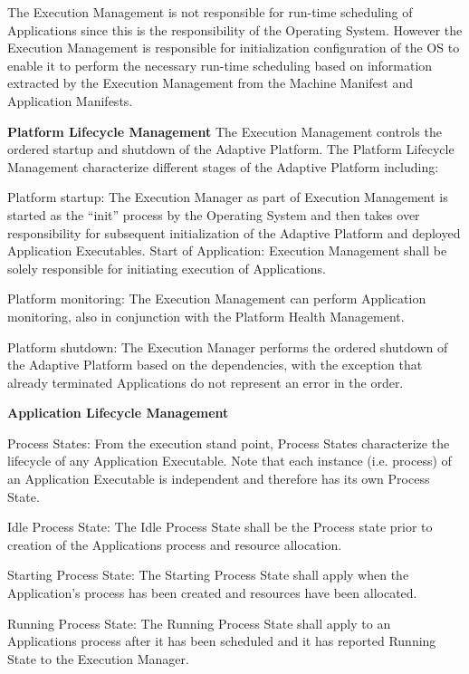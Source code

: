 \begin{DoxyItemize}
The Execution Management is not responsible for run-\/time scheduling of Applications since this is the responsibility of the Operating System. However the Execution Management is responsible for initialization configuration of the OS to enable it to perform the necessary run-\/time scheduling based on information extracted by the Execution Management from the Machine Manifest and Application Manifests.
\item {\bfseries Platform Lifecycle Management} The Execution Management controls the ordered startup and shutdown of the Adaptive Platform. The Platform Lifecycle Management characterize different stages of the Adaptive Platform including\+:
\begin{DoxyItemize}
\item Platform startup\+: The Execution Manager as part of Execution Management is started as the “init” process by the Operating System and then takes over responsibility for subsequent initialization of the Adaptive Platform and deployed Application Executables. Start of Application\+: Execution Management shall be solely responsible for initiating execution of Applications.
\item Platform monitoring\+: The Execution Management can perform Application monitoring, also in conjunction with the Platform Health Management.
\item Platform shutdown\+: The Execution Manager performs the ordered shutdown of the Adaptive Platform based on the dependencies, with the exception that already terminated Applications do not represent an error in the order.
\end{DoxyItemize}
\item {\bfseries Application Lifecycle Management}
\begin{DoxyItemize}
\item Process States\+: From the execution stand point, Process States characterize the lifecycle of any Application Executable. Note that each instance (i.\+e. process) of an Application Executable is independent and therefore has its own Process State.
\begin{DoxyItemize}
\item Idle Process State\+: The Idle Process State shall be the Process state prior to creation of the Applications process and resource allocation.
\item Starting Process State\+: The Starting Process State shall apply when the Application’s process has been created and resources have been allocated.
\item Running Process State\+: The Running Process State shall apply to an Applications process after it has been scheduled and it has reported Running State to the Execution Manager.

\end{DoxyItemize}
\end{DoxyItemize}
\end{DoxyItemize}
